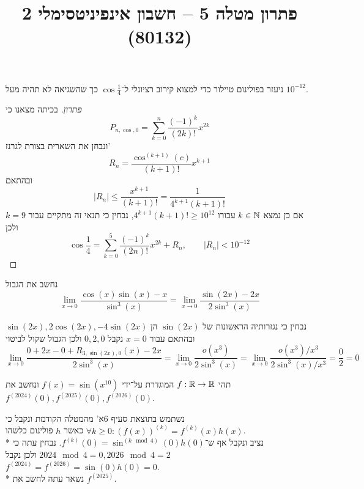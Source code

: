 
\usepackage{tikz}
\DeclareMathOperator\arcsinh{arcsinh}
\title{פתרון מטלה 5 – חשבון אינפיניטסימלי 2 (80132)}


\maketitle
\maketitleprint{}

\Question{}
ניעזר בפולינום טיילור כדי למצוא קירוב רציונלי ל־$\cos \frac{1}{4}$ כך שהשגיאה לא תהיה מעל $10^{-12}$.
\begin{proof}[פתרון]
	בכיתה מצאנו כי
	\[
		P_{n, \cos, 0} = \sum_{k = 0}^{n} \frac{{(-1)}^k}{(2k)!} x^{2k}
	\]
	ונבחן את השארית בצורת לגרנז'
	\[
		R_n = \frac{\cos^{(k + 1)}(c)}{(k + 1)!}x^{k + 1}
	\]
	ובהתאם
	\[
		|R_n| \le \frac{x^{k + 1}}{(k + 1)!} = \frac{1}{4^{k + 1}(k + 1)!}
	\]
	אם כן נמצא $k \in \mathbb{N}$ עבורו $4^{k + 1} (k + 1)! \ge 10^{12}$, נבחין כי תנאי זה מתקיים עבור $k = 9$ ולכן
	\[
		\cos \frac{1}{4} = \sum_{k = 0}^{5} \frac{{(-1)}^k}{(2n)!} x^{2k} + R_n,
		\qquad |R_n| < 10^{-12}
	\]
\end{proof}

\Question{}
נחשב את הגבול
\[
	\lim_{x \to 0} \frac{\cos(x) \sin(x) - x}{\sin^3(x)}
	= \lim_{x \to 0} \frac{\sin(2x) - 2x}{2\sin^3(x)}
\]

נבחין כי נגזרותיה הראשונות של $\sin(2x)$ הן $\sin(2x), 2\cos(2x), -4\sin(2x)$ ובהתאם עבור $x = 0$ נקבל $0, 2, 0$
ולכן הגבול שקול לביטוי
\[
	\lim_{x \to 0} \frac{0 + 2x - 0 + R_{3,\sin(2x), 0}(x) - 2x}{2 \sin^3(x)}
	= \lim_{x \to 0} \frac{o(x^3)}{2 \sin^3(x)}
	= \lim_{x \to 0} \frac{o(x^3)/x^3}{2 \sin^3(x)/x^3}
	= \frac{0}{2} = 0
\]

\Question{}
תהי $f : \mathbb{R} \to \mathbb{R}$ המוגדרת על־ידי $f(x) = \sin(x^{10})$ ונחשב את $f^{(2024)}(0),f^{(2025)}(0),f^{(2026)}(0)$.

נשתמש בתוצאת סעיף 6א' מהמטלה הקודמת ונקבל כי $\forall k \ge 0 : {(f(x))}^{(k)} = f^{(k)}(x) h(x)$ כאשר $h$ פולינום כלשהו. \\*
נציב ונקבל אף ש־$f^{(k)}(0) = \sin^{(k \mod 4)}(0) h(0)$. נבחין עתה כי $2024 \mod 4 = 0, 2026 \mod 4 = 2$ ולכן נקבל $f^{(2024)} = f^{(2026)} = \sin(0) h(0) = 0$. \\*
נשאר עתה לחשב את $f^{(2025)}$.


